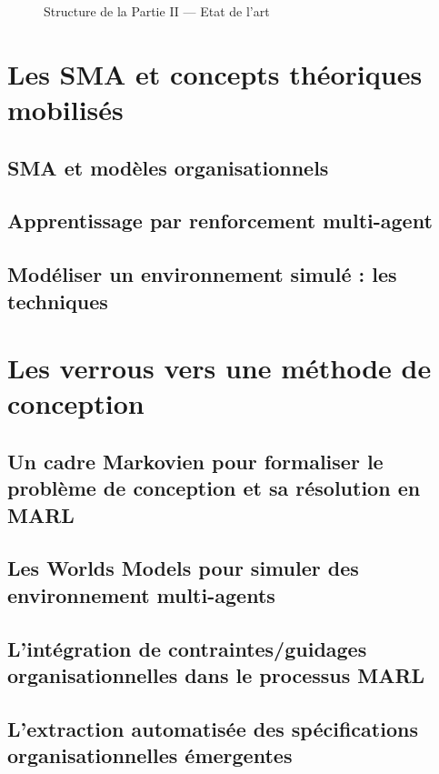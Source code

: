 \documentclass[ twoside,openright,titlepage,numbers=noenddot,headinclude,%
                footinclude=true,cleardoublepage=empty,abstractoff, %
                BCOR=5mm,paper=a4,fontsize=11pt,%
                french,american,%
                ]{scrreprt}
\begin{document}
\begin{figure}[h!]
    \centering
    \resizebox{\textwidth}{!}{%
        
    }
    \caption{Structure de la Partie II — Etat de l'art}
\end{figure}

\chapter{Les SMA et concepts théoriques mobilisés}

\section{SMA et modèles organisationnels}

\section{Apprentissage par renforcement multi-agent}

\section{Modéliser un environnement simulé : les techniques }

\chapter{Les verrous vers une méthode de conception}

\section{Un cadre Markovien pour formaliser le problème de conception et sa résolution en MARL}
\section{Les Worlds Models pour simuler des environnement multi-agents}
\section{L'intégration de contraintes/guidages organisationnelles dans le processus MARL}
\section{L'extraction automatisée des spécifications organisationnelles émergentes}
\end{document}
